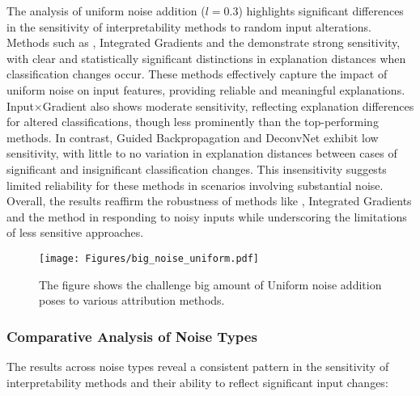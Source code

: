 The analysis of uniform noise addition ($l = 0.3$) highlights significant differences in the sensitivity of interpretability methods to random input alterations. Methods such as \LRP\/, Integrated Gradients and the \CTC\/ demonstrate strong sensitivity, with clear and statistically significant distinctions in explanation distances when classification changes occur. These methods effectively capture the impact of uniform noise on input features, providing reliable and meaningful explanations. Input$\times$Gradient also shows moderate sensitivity, reflecting explanation differences for altered classifications, though less prominently than the top-performing methods. In contrast, Guided Backpropagation and DeconvNet exhibit low sensitivity, with little to no variation in explanation distances between cases of significant and insignificant classification changes. This insensitivity suggests limited reliability for these methods in scenarios involving substantial noise. Overall, the results reaffirm the robustness of methods like \LRP\/, Integrated Gradients and the \CTC\/ method in responding to noisy inputs while underscoring the limitations of less sensitive approaches.

\begin{figure}[ht!]
	\begin{center}
		\texttt{[image: Figures/big\_noise\_uniform.pdf]}
	\end{center}
	\caption{The figure shows the challenge big amount of Uniform noise addition poses to various attribution methods.}
	\label{Fig:big_noise_uniform}
\end{figure} 


\subsubsection{Comparative Analysis of Noise Types}

The results across noise types reveal a consistent pattern in the sensitivity of interpretability methods and their ability to reflect significant input changes:

